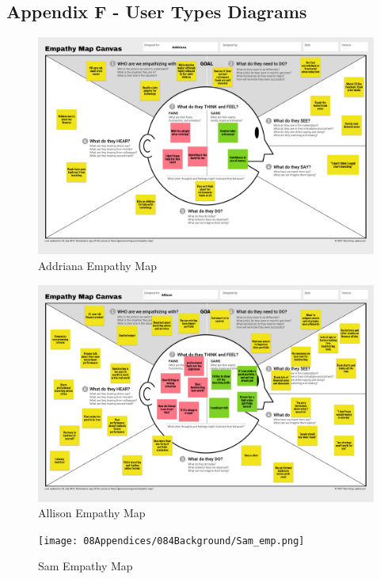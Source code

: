 \documentclass[main.tex]{subfiles}
\begin{document}
\subsection{Appendix F - User Types Diagrams}
\begin{figure}[H]
    \centering
    \includegraphics[width=1.1\textwidth,height=0.8\textheight]{08Appendices/084Background/Addriana_emp.png}
    \caption{Addriana Empathy Map}
 \end{figure}

 \begin{figure}[H]
    \centering
    \includegraphics[width=1.1\textwidth,height=0.8\textheight]{08Appendices/084Background/Allison_emp.png}
    \caption{Allison Empathy Map}
 \end{figure}

 \begin{figure}[H]
    \centering
    \texttt{[image: 08Appendices/084Background/Sam\_emp.png]}
    \caption{Sam Empathy Map}
 \end{figure}
\end{document}
